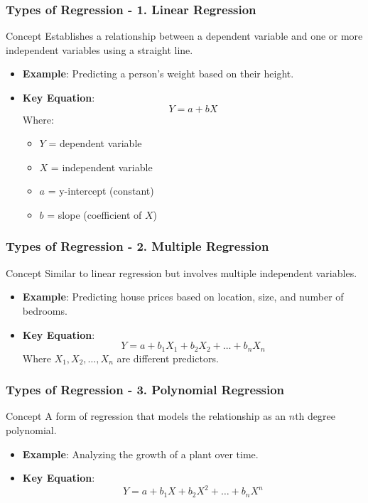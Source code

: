 \documentclass[aspectratio=169]{beamer}
\begin{document}
\begin{frame}[fragile]
    \frametitle{Types of Regression - 1. Linear Regression}
    \begin{block}{Concept}
        Establishes a relationship between a dependent variable and one or more independent variables using a straight line.
    \end{block}
    \begin{itemize}
        \item \textbf{Example}: Predicting a person's weight based on their height.
        \item \textbf{Key Equation}:
        \begin{equation}
            Y = a + bX
        \end{equation}
        Where:
        \begin{itemize}
            \item $Y$ = dependent variable
            \item $X$ = independent variable
            \item $a$ = y-intercept (constant)
            \item $b$ = slope (coefficient of $X$)
        \end{itemize}
    \end{itemize}
\end{frame}

\begin{frame}[fragile]
    \frametitle{Types of Regression - 2. Multiple Regression}
    \begin{block}{Concept}
        Similar to linear regression but involves multiple independent variables.
    \end{block}
    \begin{itemize}
        \item \textbf{Example}: Predicting house prices based on location, size, and number of bedrooms.
        \item \textbf{Key Equation}:
        \begin{equation}
            Y = a + b_1X_1 + b_2X_2 + \ldots + b_nX_n
        \end{equation}
        Where $X_1, X_2, \ldots, X_n$ are different predictors.
    \end{itemize}
\end{frame}

\begin{frame}[fragile]
    \frametitle{Types of Regression - 3. Polynomial Regression}
    \begin{block}{Concept}
        A form of regression that models the relationship as an $n$th degree polynomial.
    \end{block}
    \begin{itemize}
        \item \textbf{Example}: Analyzing the growth of a plant over time.
        \item \textbf{Key Equation}:
        \begin{equation}
            Y = a + b_1X + b_2X^2 + \ldots + b_nX^n
        \end{equation}
    \end{itemize}
\end{frame}
\end{document}
